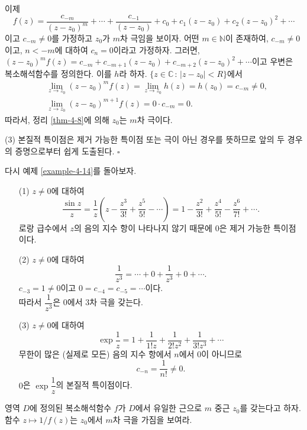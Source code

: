 이제 
\[
f(z) = \dfrac{c_{-m}}{(z-z_0)^m} + \cdots + \dfrac{c_{-1}}{(z-z_0)}
+ c_0 + c_1(z-z_0) + c_2(z-z_0)^2 + \cdots
\]
이고 $c_{-m} \ne 0$를 가정하고 $z_0$가 $m$차 극임을 보이자.
어떤 $m\in \mathbb N$이 존재하여,
$c_{-m} \ne 0$이고, $n<-m$에 대하여 $c_n=0$이라고 가정하자.
그러면, 
$(z-z_0)^mf(z) = c_{-m} + c_{-m+1}(z-z_0) + c_{-m+2}(z-z_0)^2 + \cdots$이고
우변은 복소해석함수를 정의한다. 이를 $h$라 하자.
$\{z \in \mathbb C\,:\, |z-z_0| <R\}$에서
\begin{align*}
& \lim_{z\to z_0} (z-z_0)^m f(z) = \lim_{z\to z_0} h(z) = h(z_0) = c_{-m} \ne0,\\
& \lim_{z\to z_0} (z-z_0)^{m+1}f(z) = 0 \cdot c_{-m} = 0.
\end{align*}
따라서, 정리 \ref{thm-4-8}에 의해 $z_0$는 $m$차 극이다.

(3) 본질적 특이점은 제거 가능한 특이점 또는 극이 아닌 경우를 뜻하므로 
앞의 두 경우의 증명으로부터 쉽게 도출된다.
\hfill $\square$

다시 예제 \ref{example-4-14}를 돌아보자.

\begin{saltexample}[label=example-4-16]{}{}

\begin{itemize}
\item[(1)] $z\ne0$에 대하여
\[
\dfrac{\sin z}z = \dfrac 1z\left( z - \dfrac{z^3}{3!} + \dfrac{z^5}{5!} - \cdots
\right) =1 - \dfrac{z^2}{3!} + \dfrac{z^4}{5!} - \dfrac{z^6}{7!} + \cdots.
\]
로랑 급수에서 $z$의 음의 지수 항이 나타나지 않기 때문에
$0$은 제거 가능한 특이점이다.
\item[(2)] $z\ne0$에 대하여 
\[
\dfrac1{z^3} = \cdots + 0 + \dfrac1{z^3} + 0 + \cdots.
\]
$c_{-3}=1 \ne 0$이고 $0=c_{-4} = c_{-5} = \cdots$이다. \\[1ex]
따라서 $\dfrac1{z^3}$은 $0$에서 $3$차 극을 갖는다.
\item[(3)] $z\ne0$에 대하여 
\[
\exp \dfrac1z = 1 + \dfrac1{1!z} + \dfrac1{2!z^2} + \dfrac1{3!z^3} + \cdots
\]
무한이 많은 (실제로 모든) 음의 지수 항에서 $n$에서 $0$이 아니므로
\[
c_{-n} = \dfrac1{n!} \ne 0.
\]
$0$은 $\exp \dfrac1z$의 본질적 특이점이다.
\end{itemize}
\end{saltexample}

\begin{salt_exercise}\label{ex-4-30}
영역 $D$에 정의된 복소해석함수 $f$가 $D$에서 유일한 근으로
$m$ 중근 $z_0$를 갖는다고 하자.
함수 $z\mapsto 1/f(z)$는 $z_0$에서 $m$차 극을 가짐을 보여라.
\end{salt_exercise}


